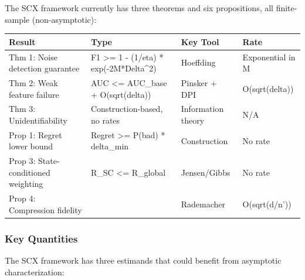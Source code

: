 \documentclass[
  12pt,
]{ctexart}
\begin{document}
The SCX framework currently has three theorems and six propositions, all
finite-sample (non-asymptotic):

\begin{longtable}[]{@{}
  >{\raggedright\arraybackslash}p{}
  >{\raggedright\arraybackslash}p{}
  >{\raggedright\arraybackslash}p{}
  >{\raggedright\arraybackslash}p{}@{}}
\toprule\noalign{}
\begin{minipage}[b]{\linewidth}\raggedright
Result
\end{minipage} & \begin{minipage}[b]{\linewidth}\raggedright
Type
\end{minipage} & \begin{minipage}[b]{\linewidth}\raggedright
Key Tool
\end{minipage} & \begin{minipage}[b]{\linewidth}\raggedright
Rate
\end{minipage} \\
\midrule\noalign{}
\endhead
\bottomrule\noalign{}
\endlastfoot
Thm 1: Noise detection guarantee & F1 \textgreater= 1 - (1/eta) *
exp(-2M*Delta\^{}2) & Hoeffding & Exponential in M \\
Thm 2: Weak feature failure & AUC \textless= AUC\_base + O(sqrt(delta))
& Pinsker + DPI & O(sqrt(delta)) \\
Thm 3: Unidentifiability & Construction-based, no rates & Information
theory & N/A \\
Prop 1: Regret lower bound & Regret \textgreater= P(bad) * delta\_min &
Construction & No rate \\
Prop 3: State-conditioned weighting & R\_SC \textless= R\_global &
Jensen/Gibbs & No rate \\
Prop 4: Compression fidelity & & Rademacher & O(sqrt(d/n')) \\
\end{longtable}

\subsubsection{Key Quantities}\label{key-quantities}

The SCX framework has three estimands that could benefit from asymptotic
characterization:
\end{document}
